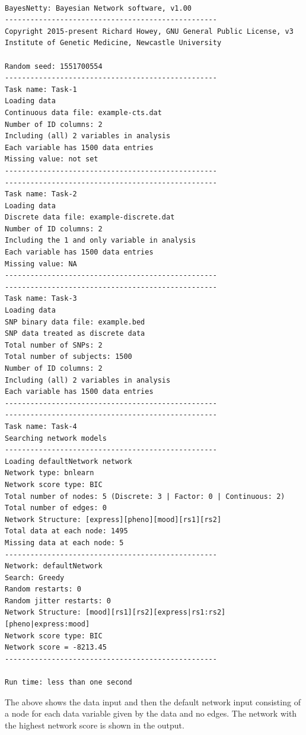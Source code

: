 \documentclass[a4paper,12pt]{article}
\begin{document}
\vspace{0.35cm} \begin{lstlisting}

BayesNetty: Bayesian Network software, v1.00
--------------------------------------------------
Copyright 2015-present Richard Howey, GNU General Public License, v3
Institute of Genetic Medicine, Newcastle University

Random seed: 1551700554
--------------------------------------------------
Task name: Task-1
Loading data
Continuous data file: example-cts.dat
Number of ID columns: 2
Including (all) 2 variables in analysis
Each variable has 1500 data entries
Missing value: not set
--------------------------------------------------
--------------------------------------------------
Task name: Task-2
Loading data
Discrete data file: example-discrete.dat
Number of ID columns: 2
Including the 1 and only variable in analysis
Each variable has 1500 data entries
Missing value: NA
--------------------------------------------------
--------------------------------------------------
Task name: Task-3
Loading data
SNP binary data file: example.bed
SNP data treated as discrete data
Total number of SNPs: 2
Total number of subjects: 1500
Number of ID columns: 2
Including (all) 2 variables in analysis
Each variable has 1500 data entries
--------------------------------------------------
--------------------------------------------------
Task name: Task-4
Searching network models
--------------------------------------------------
Loading defaultNetwork network
Network type: bnlearn
Network score type: BIC
Total number of nodes: 5 (Discrete: 3 | Factor: 0 | Continuous: 2)
Total number of edges: 0
Network Structure: [express][pheno][mood][rs1][rs2]
Total data at each node: 1495
Missing data at each node: 5
--------------------------------------------------
Network: defaultNetwork
Search: Greedy
Random restarts: 0
Random jitter restarts: 0
Network Structure: [mood][rs1][rs2][express|rs1:rs2][pheno|express:mood]
Network score type: BIC
Network score = -8213.45
--------------------------------------------------

Run time: less than one second

\end{lstlisting} \vspace{0.35cm}
The above shows the data input and then the default network input consisting of a node for each data variable given by the data and no edges. The network with the highest network score is shown in the output. 

\end{document}
